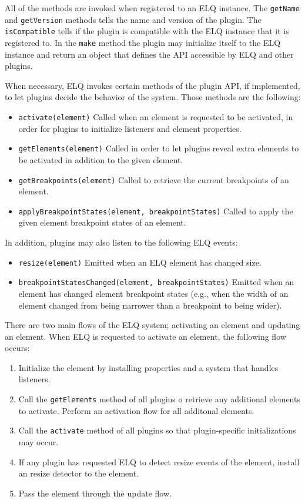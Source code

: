 \documentclass{acm_proc_article-sp}
\newcommand{\code}[1]{\texttt{#1}}
\newcommand{\elq}{ELQ}
\begin{document}
  All of the methods are invoked when registered to an \elq{} instance.
  The \code{getName} and \code{getVersion} methods tells the name and version of the plugin.
  The \code{isCompatible} tells if the plugin is compatible with the \elq{} instance that it is registered to.
  In the \code{make} method the plugin may initialize itself to the \elq{} instance and return an object that defines the API accessible by \elq{} and other plugins.

  When necessary, \elq{} invokes certain methods of the plugin API, if implemented, to let plugins decide the behavior of the system.
  Those methods are the following:
  \begin{itemize}
    \item \code{activate(element)}
          Called when an element is requested to be activated, in order for plugins to initialize listeners and element properties.
    \item \code{getElements(element)}
          Called in order to let plugins reveal extra elements to be activated in addition to the given element.
    \item \code{getBreakpoints(element)}
          Called to retrieve the current breakpoints of an element.
    \item \code{applyBreakpointStates(element, breakpointStates)}
          Called to apply the given element breakpoint states of an element.
  \end{itemize}

  In addition, plugins may also listen to the following \elq{} events:
  \begin{itemize}
    \item \code{resize(element)}
          Emitted when an \elq{} element has changed size.
    \item \code{breakpointStatesChanged(element, breakpointStates)}
          Emitted when an element has changed element breakpoint states (e.g., when the width of an element changed from being narrower than a breakpoint to being wider).
  \end{itemize}

  There are two main flows of the \elq{} system; activating an element and updating an element.
  When \elq{} is requested to activate an element, the following flow occurs:

  \begin{enumerate}
    \item Initialize the element by installing properties and a system that handles listeners.
    \item 
          Call the \code{getElements} method of all plugins o retrieve any additional elements to activate.
          Perform an activation flow for all additonal elements.
    \item Call the \code{activate} method of all plugins so that plugin-specific initializations may occur.
    \item If any plugin has requested \elq{} to detect resize events of the element, install an resize detector to the element.
    \item Pass the element through the update flow.
  \end{enumerate}
\end{document}
